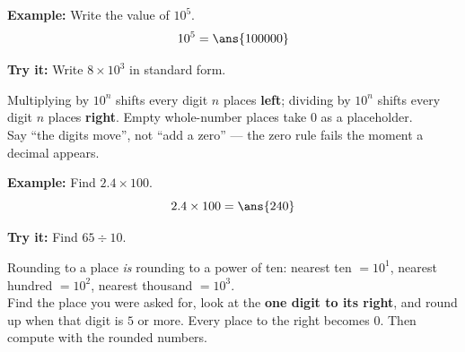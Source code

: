 \documentclass[12pt]{article}
\begin{document}
\begin{examplebox}
\textbf{Example:} Write the value of $10^5$.
\[ 10^5 = \ans{100000} \]
\end{examplebox}

\begin{tryitbox}
\textbf{Try it:} Write $8 \times 10^3$ in standard form.\\[2pt]
\end{tryitbox}


\begin{formulabox}
Multiplying by $10^n$ shifts every digit $n$ places \textbf{left}; dividing by
$10^n$ shifts every digit $n$ places \textbf{right}. Empty whole-number places
take $0$ as a placeholder.\\[2pt]
Say ``the digits move'', not ``add a zero'' --- the zero rule fails the moment a
decimal appears.
\end{formulabox}

\begin{examplebox}
\textbf{Example:} Find $2.4 \times 100$.
\[ 2.4 \times 100 = \ans{240} \]
\end{examplebox}

\begin{tryitbox}
\textbf{Try it:} Find $65 \div 10$.\\[2pt]
\end{tryitbox}


\begin{formulabox}
Rounding to a place \emph{is} rounding to a power of ten: nearest ten $=10^1$,
nearest hundred $=10^2$, nearest thousand $=10^3$.\\[2pt]
Find the place you were asked for, look at the \textbf{one digit to its right},
and round up when that digit is $5$ or more. Every place to the right becomes
$0$. Then compute with the rounded numbers.
\end{formulabox}
\end{document}
